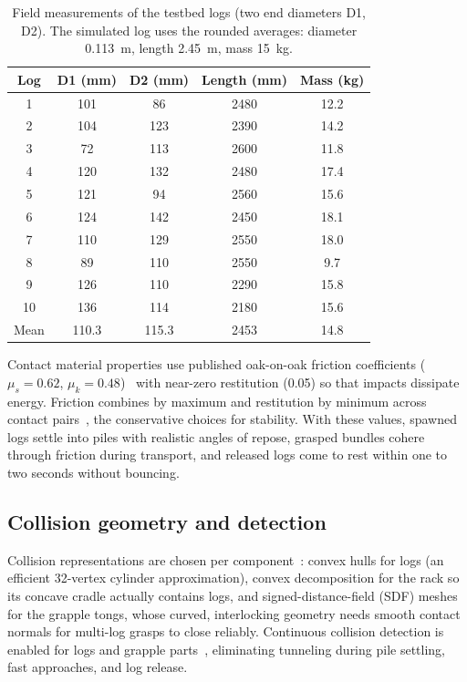 \begin{table}[t]
\centering
\caption{Field measurements of the testbed logs (two end diameters D1, D2).
The simulated log uses the rounded averages: diameter 0.113~m, length 2.45~m,
mass 15~kg.}
\label{tab:log_measurements}
\begin{tabular}{ccccc}
\hline
\textbf{Log} & \textbf{D1 (mm)} & \textbf{D2 (mm)} & \textbf{Length (mm)} & \textbf{Mass (kg)} \\
\hline
1 & 101 & 86 & 2480 & 12.2 \\
2 & 104 & 123 & 2390 & 14.2 \\
3 & 72 & 113 & 2600 & 11.8 \\
4 & 120 & 132 & 2480 & 17.4 \\
5 & 121 & 94 & 2560 & 15.6 \\
6 & 124 & 142 & 2450 & 18.1 \\
7 & 110 & 129 & 2550 & 18.0 \\
8 & 89 & 110 & 2550 & 9.7 \\
9 & 126 & 110 & 2290 & 15.8 \\
10 & 136 & 114 & 2180 & 15.6 \\
\hline
Mean & 110.3 & 115.3 & 2453 & 14.8 \\
\hline
\end{tabular}
\end{table}

Contact material properties use published oak-on-oak friction coefficients
($\mu_s = 0.62$, $\mu_k = 0.48$)~\cite{avallone2006marks} with near-zero
restitution (0.05) so that impacts dissipate energy. Friction combines by
maximum and restitution by minimum across contact pairs~\cite{nvidia_combine},
the conservative choices for stability. With these values, spawned logs settle
into piles with realistic angles of repose, grasped bundles cohere through
friction during transport, and released logs come to rest within one to two
seconds without bouncing.

\subsection{Collision geometry and detection}

Collision representations are chosen per component~\cite{nvidia_colliders}:
convex hulls for logs (an efficient 32-vertex cylinder approximation), convex
decomposition for the rack so its concave cradle actually contains logs, and
signed-distance-field (SDF) meshes for the grapple tongs, whose curved,
interlocking geometry needs smooth contact normals for multi-log grasps to
close reliably. Continuous collision detection is enabled for logs and
grapple parts~\cite{nvidia_ccd}, eliminating tunneling during pile settling,
fast approaches, and log release.


